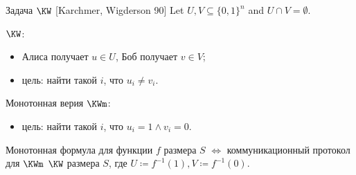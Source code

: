 \begin{frame}{Задача $\KW$ [Karchmer, Wigderson 90]}
    Let $U, V \subseteq \{0, 1\}^{n}$ and $U \cap V = \emptyset$.

    \vspace{0.1cm}
    $\KW$:
    \begin{itemize}
        \item Алиса получает $u \in U$, Боб получает $v \in V$;
        \item цель: найти такой $i$, что $u_i \neq v_i$.
    \end{itemize}
    \pause
    Монотонная верия $\KWm$:
    \begin{itemize}
        \item цель: найти такой $i$, что $u_i = 1 \land v_i = 0$.
    \end{itemize}

    \pause

    \begin{theorem}
        \alert{Монотонная} формула для функции $f$ размера $S$ $\Leftrightarrow$ коммуникационный
        протокол для \alert{$\KWm$} $\KW$ размера $S$, где $U \coloneqq f^{-1}(1), V \coloneqq
        f^{-1}(0)$.
    \end{theorem}
\end{frame}


